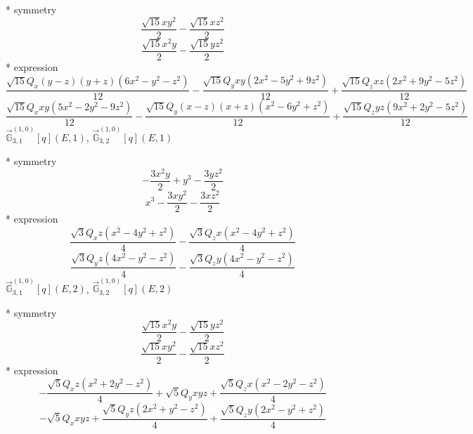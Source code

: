 \documentclass[fleqn,8pt]{jsarticle}
\begin{document}
\noindent\quad ** symmetry
\begin{dmath*}
\frac{\sqrt{15} x y^{2}}{2} - \frac{\sqrt{15} x z^{2}}{2}
\end{dmath*}
\begin{dmath*}
\frac{\sqrt{15} x^{2} y}{2} - \frac{\sqrt{15} y z^{2}}{2}
\end{dmath*}
\noindent\quad ** expression
\begin{dmath*}
\frac{\sqrt{15} Q_{x} \left(y - z\right) \left(y + z\right) \left(6 x^{2} - y^{2} - z^{2}\right)}{12} - \frac{\sqrt{15} Q_{y} x y \left(2 x^{2} - 5 y^{2} + 9 z^{2}\right)}{12} + \frac{\sqrt{15} Q_{z} x z \left(2 x^{2} + 9 y^{2} - 5 z^{2}\right)}{12}
\end{dmath*}
\begin{dmath*}
\frac{\sqrt{15} Q_{x} x y \left(5 x^{2} - 2 y^{2} - 9 z^{2}\right)}{12} - \frac{\sqrt{15} Q_{y} \left(x - z\right) \left(x + z\right) \left(x^{2} - 6 y^{2} + z^{2}\right)}{12} + \frac{\sqrt{15} Q_{z} y z \left(9 x^{2} + 2 y^{2} - 5 z^{2}\right)}{12}
\end{dmath*}
\noindent\quad $\vec{\mathbb{G}}_{3,1}^{(1,0)}[q](E,1)$, $\vec{\mathbb{G}}_{3,2}^{(1,0)}[q](E,1)$

\noindent\quad ** symmetry
\begin{dmath*}
- \frac{3 x^{2} y}{2} + y^{3} - \frac{3 y z^{2}}{2}
\end{dmath*}
\begin{dmath*}
x^{3} - \frac{3 x y^{2}}{2} - \frac{3 x z^{2}}{2}
\end{dmath*}
\noindent\quad ** expression
\begin{dmath*}
\frac{\sqrt{3} Q_{x} z \left(x^{2} - 4 y^{2} + z^{2}\right)}{4} - \frac{\sqrt{3} Q_{z} x \left(x^{2} - 4 y^{2} + z^{2}\right)}{4}
\end{dmath*}
\begin{dmath*}
\frac{\sqrt{3} Q_{y} z \left(4 x^{2} - y^{2} - z^{2}\right)}{4} - \frac{\sqrt{3} Q_{z} y \left(4 x^{2} - y^{2} - z^{2}\right)}{4}
\end{dmath*}
\noindent\quad $\vec{\mathbb{G}}_{3,1}^{(1,0)}[q](E,2)$, $\vec{\mathbb{G}}_{3,2}^{(1,0)}[q](E,2)$

\noindent\quad ** symmetry
\begin{dmath*}
\frac{\sqrt{15} x^{2} y}{2} - \frac{\sqrt{15} y z^{2}}{2}
\end{dmath*}
\begin{dmath*}
\frac{\sqrt{15} x y^{2}}{2} - \frac{\sqrt{15} x z^{2}}{2}
\end{dmath*}
\noindent\quad ** expression
\begin{dmath*}
- \frac{\sqrt{5} Q_{x} z \left(x^{2} + 2 y^{2} - z^{2}\right)}{4} + \sqrt{5} Q_{y} x y z + \frac{\sqrt{5} Q_{z} x \left(x^{2} - 2 y^{2} - z^{2}\right)}{4}
\end{dmath*}
\begin{dmath*}
- \sqrt{5} Q_{x} x y z + \frac{\sqrt{5} Q_{y} z \left(2 x^{2} + y^{2} - z^{2}\right)}{4} + \frac{\sqrt{5} Q_{z} y \left(2 x^{2} - y^{2} + z^{2}\right)}{4}
\end{dmath*}
\end{document}
